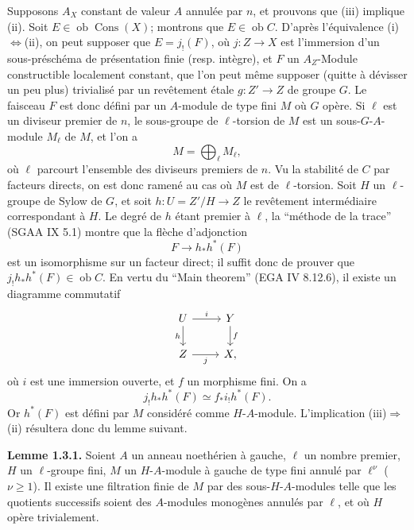 \documentclass[11pt]{article}
\providecommand{\Cons}{\operatorname{Cons}}
\newcommand{\ob}{\operatorname{ob}}
\providecommand{\ob}{\operatorname{ob}}
\begin{document}
Supposons $A_X$ constant de valeur $A$ annulée par $n$, et prouvons que (iii) implique (ii). Soit $E\in\ob\Cons(X)$; montrons que $E\in\ob C$. D'après l'équivalence (i)$\Leftrightarrow$(ii), on peut supposer que $E=j_!(F)$, où $j:Z\to X$ est l'immersion d'un sous-préschéma de présentation finie (resp. intègre), et $F$ un $A_Z$-Module constructible localement constant, que l'on peut même supposer (quitte à dévisser un peu plus) trivialisé par un revêtement étale $g:Z'\to Z$ de groupe $G$. Le faisceau $F$ est donc défini par un $A$-module de type fini $M$ où $G$ opère. Si $\ell$ est un diviseur premier de $n$, le sous-groupe de $\ell$-torsion de $M$ est un sous-$G$-$A$-module $M_\ell$ de $M$, et l'on a
\[
        M=\bigoplus_\ell M_\ell,
\]
où $\ell$ parcourt l'ensemble des diviseurs premiers de $n$. Vu la stabilité de $C$ par facteurs directs, on est donc ramené au cas où $M$ est de $\ell$-torsion. Soit $H$ un $\ell$-groupe de Sylow de $G$, et soit $h:U=Z'/H\to Z$ le revêtement intermédiaire correspondant à $H$. Le degré de $h$ étant premier à $\ell$, la ``méthode de la trace'' (SGAA IX 5.1) montre que la flèche d'adjonction
\[
        F\longrightarrow h_*h^*(F)
\]
est un isomorphisme sur un facteur direct; il suffit donc de prouver que $j_!h_*h^*(F)\in\ob C$. En vertu du ``Main theorem'' (EGA IV 8.12.6), il existe un diagramme commutatif
\[
\begin{tikzcd}
U \arrow[r,"i"] \arrow[d,"h"'] & Y \arrow[d,"f"]\\
Z \arrow[r,"j"'] & X,
\end{tikzcd}
\]
où $i$ est une immersion ouverte, et $f$ un morphisme fini. On a
\[
        j_!h_*h^*(F) \simeq f_* i_! h^*(F).
\]
Or $h^*(F)$ est défini par $M$ considéré comme $H$-$A$-module. L'implication (iii)$\Rightarrow$(ii) résultera donc du lemme suivant.

\textbf{Lemme 1.3.1.} Soient $A$ un anneau noethérien à gauche, $\ell$ un nombre premier, $H$ un $\ell$-groupe fini, $M$ un $H$-$A$-module à gauche de type fini annulé par $\ell^\nu$ ($\nu\geq 1$). Il existe une filtration finie de $M$ par des sous-$H$-$A$-modules telle que les quotients successifs soient des $A$-modules monogènes annulés par $\ell$, et où $H$ opère trivialement.
\end{document}

